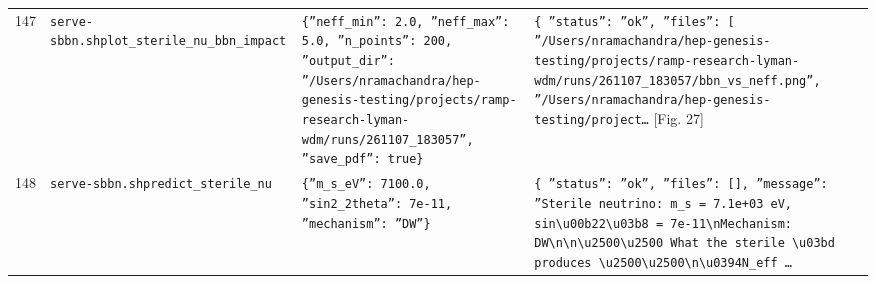 \documentclass[11pt,a4paper]{article}
\begin{document}
\begin{longtable}{@{}p{}p{}p{}p{}@{}}
147 & \texttt{serve-sbbn.sh}\newline\texttt{plot\_\allowbreak{}sterile\_\allowbreak{}nu\_\allowbreak{}bbn\_\allowbreak{}impact} & \texttt{\{''neff\_\allowbreak{}min'':\allowbreak{} 2.0,\allowbreak{} ''neff\_\allowbreak{}max'':\allowbreak{} 5.0,\allowbreak{} ''n\_\allowbreak{}points'':\allowbreak{} 200,\allowbreak{} ''output\_\allowbreak{}dir'':\allowbreak{} ''/\allowbreak{}Users/\allowbreak{}nramachandra/\allowbreak{}hep-genesis-testing/\allowbreak{}projects/\allowbreak{}ramp-research-lyman-wdm/\allowbreak{}runs/\allowbreak{}261107\_\allowbreak{}183057'',\allowbreak{} ''save\_\allowbreak{}pdf'':\allowbreak{} true\}\allowbreak{}} & \texttt{\{   ''status'':\allowbreak{} ''ok'',\allowbreak{}   ''files'':\allowbreak{} [     ''/\allowbreak{}Users/\allowbreak{}nramachandra/\allowbreak{}hep-genesis-testing/\allowbreak{}projects/\allowbreak{}ramp-research-lyman-wdm/\allowbreak{}runs/\allowbreak{}261107\_\allowbreak{}183057/\allowbreak{}bbn\_\allowbreak{}vs\_\allowbreak{}neff.png'',\allowbreak{}     ''/\allowbreak{}Users/\allowbreak{}nramachandra/\allowbreak{}hep-genesis-testing/\allowbreak{}project\ldots{}\allowbreak{}} [Fig. 27] \\
148 & \texttt{serve-sbbn.sh}\newline\texttt{predict\_\allowbreak{}sterile\_\allowbreak{}nu} & \texttt{\{''m\_\allowbreak{}s\_\allowbreak{}eV'':\allowbreak{} 7100.0,\allowbreak{} ''sin2\_\allowbreak{}2theta'':\allowbreak{} 7e-11,\allowbreak{} ''mechanism'':\allowbreak{} ''DW''\}\allowbreak{}} & \texttt{\{   ''status'':\allowbreak{} ''ok'',\allowbreak{}   ''files'':\allowbreak{} []\allowbreak{},\allowbreak{}   ''message'':\allowbreak{} ''Sterile neutrino:\allowbreak{} m\_\allowbreak{}s =\allowbreak{} 7.1e+03 eV,\allowbreak{} sin\textbackslash{}\allowbreak{}u00b22\textbackslash{}\allowbreak{}u03b8 =\allowbreak{} 7e-11\textbackslash{}\allowbreak{}nMechanism:\allowbreak{} DW\textbackslash{}\allowbreak{}n\textbackslash{}\allowbreak{}n\textbackslash{}\allowbreak{}u2500\textbackslash{}\allowbreak{}u2500 What the sterile \textbackslash{}\allowbreak{}u03bd produces \textbackslash{}\allowbreak{}u2500\textbackslash{}\allowbreak{}u2500\textbackslash{}\allowbreak{}n\textbackslash{}\allowbreak{}u0394N\_\allowbreak{}eff \ldots{}\allowbreak{}} \\

\end{longtable}
\end{document}
